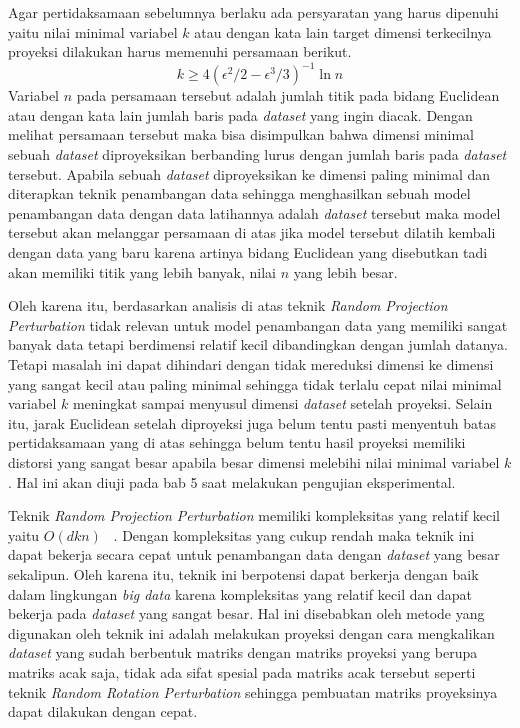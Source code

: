 Agar pertidaksamaan sebelumnya berlaku ada persyaratan yang harus dipenuhi yaitu nilai minimal variabel \(k\) atau dengan kata lain target dimensi terkecilnya proyeksi dilakukan harus memenuhi persamaan berikut.
\begin{equation}
	k \geq 4(\epsilon^{2}/2-\epsilon^{3}/3)^{-1}\ln{n}
\end{equation}
Variabel \(n\) pada persamaan tersebut adalah jumlah titik pada bidang Euclidean atau dengan kata lain jumlah baris pada \textit{dataset} yang ingin diacak. Dengan melihat persamaan tersebut maka bisa disimpulkan bahwa dimensi minimal sebuah \textit{dataset} diproyeksikan berbanding lurus dengan jumlah baris pada \textit{dataset} tersebut. Apabila sebuah \textit{dataset} diproyeksikan ke dimensi paling minimal dan diterapkan teknik penambangan data sehingga menghasilkan sebuah model penambangan data dengan data latihannya adalah \textit{dataset} tersebut maka model tersebut akan melanggar persamaan di atas jika model tersebut dilatih kembali dengan data yang baru karena artinya bidang Euclidean yang disebutkan tadi akan memiliki titik yang lebih banyak, nilai \(n\) yang lebih besar. 

Oleh karena itu, berdasarkan analisis di atas teknik \textit{Random Projection Perturbation} tidak relevan untuk model penambangan data yang memiliki sangat banyak data tetapi berdimensi relatif kecil dibandingkan dengan jumlah datanya. Tetapi masalah ini dapat dihindari dengan tidak mereduksi dimensi ke dimensi yang sangat kecil atau paling minimal sehingga tidak terlalu cepat nilai minimal variabel \(k\) meningkat sampai menyusul dimensi \textit{dataset} setelah proyeksi. Selain itu, jarak Euclidean setelah diproyeksi juga belum tentu pasti menyentuh batas pertidaksamaan yang di atas sehingga belum tentu hasil proyeksi memiliki distorsi yang sangat besar apabila besar dimensi melebihi nilai minimal variabel \(k\). Hal ini akan diuji pada bab 5 saat melakukan pengujian eksperimental.

Teknik \textit{Random Projection Perturbation} memiliki kompleksitas yang relatif kecil yaitu \(O(dkn)\) ~\cite{bingham:01:projection}. Dengan kompleksitas yang cukup rendah maka teknik ini dapat bekerja secara cepat untuk penambangan data dengan \textit{dataset} yang besar sekalipun. Oleh karena itu, teknik ini berpotensi dapat berkerja dengan baik dalam lingkungan \textit{big data} karena kompleksitas yang relatif kecil dan dapat bekerja pada \textit{dataset} yang sangat besar. Hal ini disebabkan oleh metode yang digunakan oleh teknik ini adalah melakukan proyeksi dengan cara mengkalikan \textit{dataset} yang sudah berbentuk matriks dengan matriks proyeksi yang berupa matriks acak saja, tidak ada sifat spesial pada matriks acak tersebut seperti teknik \textit{Random Rotation Perturbation} sehingga pembuatan matriks proyeksinya dapat dilakukan dengan cepat.

